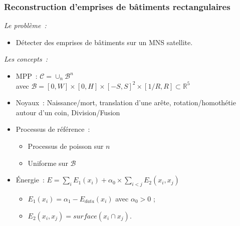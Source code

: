 \documentclass{beamer}
\begin{document}
\begin{frame}
\frametitle{Reconstruction d'emprises de bâtiments rectangulaires}
\emph{Le probl\`eme~:} 
\begin{itemize}
\item Détecter des emprises de bâtiments sur un MNS satellite.
\end{itemize}
\emph{Les concepts~:}
\begin{itemize}
\item MPP~:  $\mathcal{C} = \cup_{n}\mathcal{B}^n$\\
avec $\mathcal{B}=[0,W]\times[0,H]\times[-S,S]^2\times[1/R,R] \subset  \mathds{R}^{5}$
\item Noyaux~: Naissance/mort, translation d'une arête, rotation/homothétie autour d'un coin, Division/Fusion
\item Processus de référence~:
\begin{itemize}
\item Processus de poisson sur $n$
\item Uniforme sur $\mathcal{B}$
\end{itemize}
\item \'Energie~: $E = \sum_i E_1(x_i) + \alpha_{0} \times \sum_{i<j} E_2(x_i,x_j)$
\begin{itemize}
\item $E_1(x_i)=\alpha_{1} - E_{data}(x_i)$ avec $\alpha_{0}>0$ ;
\item $E_2(x_i,x_j) = surface(x_i \cap x_j)$.
\end{itemize}
\end{itemize}
\end{frame}
\end{document}
